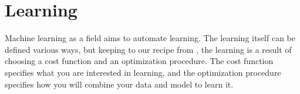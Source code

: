 \chapter{Learning}
\label{chap:learning}
Machine learning as a field aims to automate learning.
The learning itself can be defined various ways, but keeping to our recipe from \cite{goodfellowDeepLearning2016}, the learning is a result of choosing a cost function and an optimization procedure.
The cost function specifies what you are interested in learning, and the optimization procedure specifies how you will combine your data and model to learn it. 

